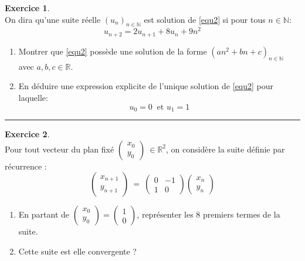 \documentclass[10pt,a4paper]{article}
\newcommand{\R}{\mathbb{R}}
\newcommand{\N}{\mathbb{N}}
\theoremstyle{definition}
\theoremstyle{definition}
\newtheorem{exo}{Exercice}
\begin{document}
\begin{center}
\begin{minipage}[t]{0.47\linewidth}
\raggedright

\begin{exo}\quad\\
On dira qu'une suite réelle $\left(u_n\right)_{n\in\N} $ est solution de \eqref{equ2} si pour tous $n\in\N$:
\begin{equation}
u_{n+2} = 2u_{n+1} +8u_n+9n^2
\label{equ2}
\end{equation}

\begin{enumerate}
\item Montrer que \eqref{equ2} possède une solution de la forme $\left(an^2+bn+c\right)_{n\in\N} $ avec $a,b,c\in\R$.

\item En déduire une expression explicite de l'unique solution de \eqref{equ2} pour laquelle:
$$u_{0} = 0 \ \text{ et } u_1 = 1$$

\end{enumerate}
\end{exo}
\begin{center}
\rule{1\linewidth}{0.6pt}
\end{center}

\begin{exo}\quad\\
Pour tout vecteur du plan fixé $\left(\begin{array}{c}
x_0\\
y_0
\end{array}\right) \ \in\R^2$, on considère la suite définie par récurrence :
$$\left(\begin{array}{c}
x_{n+1}\\
y_{n+1}
\end{array}\right) \ = \ \left(\begin{array}{cc}
0 & -1\\
1 & 0
\end{array}\right) \left(\begin{array}{c}
x_n\\
y_n
\end{array}\right)$$
\begin{enumerate}
\item En partant de $\left(\begin{array}{c}
x_0\\
y_0
\end{array}\right)  =  \left(\begin{array}{c}
1\\
0
\end{array}\right) $, représenter les $8$ premiers termes de la suite.
\item Cette suite est elle convergente ? 
\end{enumerate}
\end{exo}


\end{minipage}
\end{center}
\end{document}
